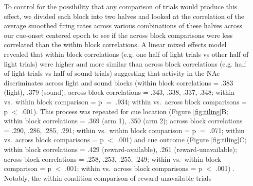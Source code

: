 \documentclass[11pt]{article}
\providecommand{\DIFadd}[1]{{\protect\color{red} \sf #1}} %
\providecommand{\DIFdel}[1]{} %
\providecommand{\DIFaddbegin}{} %
\providecommand{\DIFaddend}{} %
\providecommand{\DIFdelbegin}{} %
\providecommand{\DIFdelend}{} %
\newcommand{\DIFscaledelfig}{0.5}
\newlength{\DIFdelgraphicswidth} %
\newlength{\DIFdelgraphicsheight} %
\newcommand{\DIFaddincludegraphics}[2][]{{\color{red}\fbox{\DIFOincludegraphics[#1]{#2}}}} %
\newcommand{\DIFdelincludegraphics}[2][]{%
\sbox{\DIFdelgraphicsbox}{\DIFOincludegraphics[#1]{#2}}%
\settoboxwidth{\DIFdelgraphicswidth}{\DIFdelgraphicsbox} %
\settoboxtotalheight{\DIFdelgraphicsheight}{\DIFdelgraphicsbox} %
\scalebox{\DIFscaledelfig}{%
\parbox[b]{\DIFdelgraphicswidth}{\usebox{\DIFdelgraphicsbox}\\[-\baselineskip] \rule{\DIFdelgraphicswidth}{0em}}\llap{\resizebox{\DIFdelgraphicswidth}{\DIFdelgraphicsheight}{%
\setlength{\unitlength}{\DIFdelgraphicswidth}%
\begin{picture}(1,1)%
\thicklines\linethickness{2pt} %
{\color[rgb]{1,0,0}\put(0,0){\framebox(1,1){}}}%
{\color[rgb]{1,0,0}\put(0,0){\line( 1,1){1}}}%
{\color[rgb]{1,0,0}\put(0,1){\line(1,-1){1}}}%
\end{picture}%
}\hspace*{3pt}}} %
} %
\DeclareRobustCommand{\DIFaddbegin}{\DIFOaddbegin \let\includegraphics\DIFaddincludegraphics} %
\DeclareRobustCommand{\DIFaddend}{\DIFOaddend \let\includegraphics\DIFOincludegraphics} %
\DeclareRobustCommand{\DIFdelbegin}{\DIFOdelbegin \let\includegraphics\DIFdelincludegraphics} %
\DeclareRobustCommand{\DIFdelend}{\DIFOaddend \let\includegraphics\DIFOincludegraphics} %
\begin{document}
\DIFaddend To control for the possibility that any comparison of
trials would produce this effect, we \DIFdelbegin \DIFdel{did a within block comparison, comparing
half of the trials in the light block against the other half. This comparison
looked similar to our test comparison of sound block trials ordered by light
block trials. Additionally, given that the majority of our units showed an
inhibitory response to the cue, we also plotted the firing rates according to
the lowest time in firing, and again found some maintenance of order, but
largely different ordering across the two blocks, and the within block
comparison (Figure \ref{fig:tiling}D). To further test this, we }\DIFdelend divided each
block into two halves and looked at the correlation of the average
smoothed firing rates across various combinations of these halves
across our \DIFdelbegin \DIFdel{cue-aligned
centered epoch }\DIFdelend \DIFaddbegin \DIFadd{cue-onset centered epoch to see if the across block comparisons were less correlated than the within block correlations}\DIFaddend . A linear mixed effects model
revealed that within block correlations (e.g. one half of light trials
vs other half of light trials) were higher and more similar than
across block correlations (e.g. half of light trials vs half of sound
trials) suggesting that activity in the NAc discriminates across
\DIFdelbegin \DIFdel{various cue conditions }\DIFdelend \DIFaddbegin \DIFadd{light and sound blocks }\DIFaddend (within block correlations = .383 (light), .379
(sound); across block correlations = .343, .338, .337, .348; within \DIFdelbegin \DIFdel{block }\DIFdelend vs.\ within block comparison = p $=$ .934; within \DIFdelbegin \DIFdel{block }\DIFdelend vs.\ across block comparisons = p $<$ .001). This process was repeated for cue location (Figure \ref{fig:tiling}B\DIFdelbegin \DIFdel{,E}\DIFdelend ; within block
correlations = .369 (arm 1), .350 (arm 2); across block correlations =
.290, .286, .285, .291; within \DIFdelbegin \DIFdel{block }\DIFdelend vs.\ within block comparison = p
$=$ .071; within \DIFdelbegin \DIFdel{block }\DIFdelend vs.\ across block comparisons = p $<$ .001) and
cue outcome (Figure \ref{fig:tiling}C\DIFdelbegin \DIFdel{,F}\DIFdelend ; within block correlations =
.429 (reward-available), .261 (reward-unavailable); across block
correlations = .258, .253, .255, .249; within \DIFdelbegin \DIFdel{block }\DIFdelend vs.\ within block
comparison = p $<$ .001; within \DIFdelbegin \DIFdel{block }\DIFdelend vs.\ across block comparisons =
p $<$ .001)\DIFdelbegin \DIFdel{, showing that NAc segmentation of the task is qualitatively
different even during those parts of the task not immediately associated with a
specific cue, action, or outcome, although the }\DIFdelend \DIFaddbegin \DIFadd{. Notably, the }\DIFaddend within condition comparison of reward-unavailable trials
\end{document}
